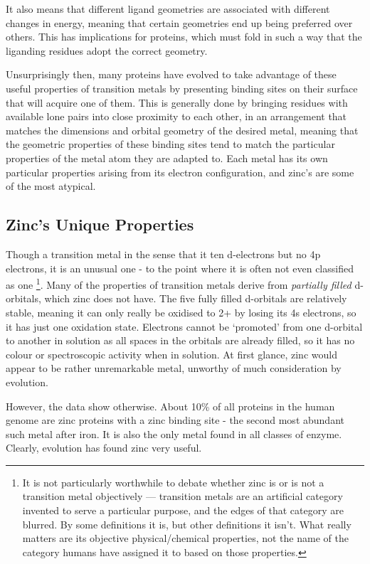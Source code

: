It also means that different ligand geometries are associated with different changes in energy, meaning that certain geometries end up being preferred over others. This has implications for proteins, which must fold in such a way that the liganding residues adopt the correct geometry.

Unsurprisingly then, many proteins have evolved to take advantage of these useful properties of transition metals by presenting binding sites on their surface that will acquire one of them. This is generally done by bringing residues with available lone pairs into close proximity to each other, in an arrangement that matches the dimensions and orbital geometry of the desired metal, meaning that the geometric properties of these binding sites tend to match the particular properties of the metal atom they are adapted to. Each metal has its own particular properties arising from its electron configuration, and zinc's are some of the most atypical.

\subsection{Zinc's Unique Properties}

Though a transition metal in the sense that it ten d-electrons but no 4p electrons, it is an unusual one - to the point where it is often not even classified as one \footnote{It is not particularly worthwhile to debate whether zinc is or is not a transition metal objectively --- transition metals are an artificial category invented to serve a particular purpose, and the edges of that category are blurred. By some definitions it is, but other definitions it isn't. What really matters are its objective physical/chemical properties, not the name of the category humans have assigned it to based on those properties.}. Many of the properties of transition metals derive from \emph{partially filled} d-orbitals, which zinc does not have. The five fully filled d-orbitals are relatively stable, meaning it can only really be oxidised to 2+ by losing its 4s electrons, so it has just one oxidation state. Electrons cannot be `promoted' from one d-orbital to another in solution as all spaces in the orbitals are already filled, so it has no colour or spectroscopic activity when in solution. At first glance, zinc would appear to be rather unremarkable metal, unworthy of much consideration by evolution.

However, the data show otherwise. About 10\% of all proteins in the human genome are zinc proteins with a zinc binding site - the second most abundant such metal after iron. It is also the only metal found in all classes of enzyme. Clearly, evolution has found zinc very useful.

